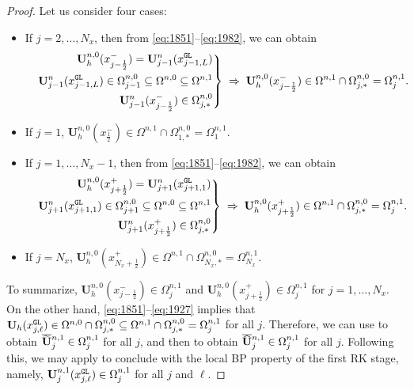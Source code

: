 \documentclass[times,final]{elsarticle}
\numberwithin{equation}{section}
\theoremstyle{definition}
\theoremstyle{remark}
\newcommand{\BU}{\mathbf{U}}
\newcommand{\toBU}{
	\mathrlap{
		\raisebox{1.2 pt}{$\overline{\phantom{\mathbf{U}}}$}
	}
	\mathrlap{
		\raisebox{-0.9 pt}{$\widetilde{\phantom{\mathbf{U}}}$}
	}
	\mathbf{U}
}
\newcommand{\hoBU}{
	\mathrlap{
		\raisebox{1.2 pt}{$\overline{\phantom{\mathbf{U}}}$}
	}
	\mathrlap{
		\raisebox{-0.9 pt}{$\widehat{\phantom{\mathbf{U}}}$}
	}
	\mathbf{U}
}
\begin{document}
\begin{proof}
	Let us consider four cases:
	\begin{itemize}[leftmargin= 6mm]
		\item[(i)] If $j = 2,\dots,N_x$, then from \eqref{eq:1851}--\eqref{eq:1982}, we can obtain
		\begin{equation*}
			\left.
			\begin{aligned}
				&& \BU_h^{n,0}(x_{j-\frac12}^{-}) = \BU^{n}_{j-1}(x^{\tt GL}_{j-1,L})\\
				&& \BU^{n}_{j-1}(x^{\tt GL}_{j-1,L}) \in \Omega^{n, 0}_{j-1} \subseteq \Omega^{n,0} \subseteq \Omega^{n,1} \\
				&& \BU^{n}_{j-1}(x^{-}_{j-\frac12}) \in \Omega^{n, 0}_{j, *}
			\end{aligned}
			\right\}
			\; \Rightarrow \;
			\BU_h^{n,0}(x_{j-\frac12}^{-}) \in \Omega^{n,1} \cap \Omega^{n, 0}_{j, *} = \Omega^{n, 1}_{j}.
		\end{equation*}
		\item[(ii)] If $j = 1$, $\BU^{n,0}_h(x_{\frac12}^{-}) \in \Omega^{n,1} \cap \Omega^{n,0}_{1,*} = \Omega^{n,1}_{1}$. 
		\item[(iii)] If $j = 1,\dots,N_x-1$, then from \eqref{eq:1851}--\eqref{eq:1982}, we can obtain
		\begin{equation*}
			\left.
			\begin{aligned}
				&& \BU_h^{n,0}(x_{j+\frac12}^{+}) = \BU^{n}_{j+1}(x^{\tt GL}_{j+1,1}) \\
				&& \BU^{n}_{j+1}(x^{\tt GL}_{j+1,1}) \in \Omega^{n, 0}_{j+1} \subseteq \Omega^{n,0} \subseteq \Omega^{n,1} \\
				&& \BU^{n}_{j+1}(x^{+}_{j+\frac12}) \in \Omega^{n, 0}_{j, *}
			\end{aligned}
			\right\}
			\;\Rightarrow \;
			\BU_h^{n,0}(x_{j+\frac12}^{+}) \in \Omega^{n,1} \cap \Omega^{n, 0}_{j, *} = \Omega^{n, 1}_{j}.
		\end{equation*}
		\item[(iv)] If $j = N_x$, $\BU^{n,0}_h(x_{N_x +\frac12}^{+}) \in \Omega^{n,1} \cap \Omega^{n,0}_{N_x,*} = \Omega^{n,1}_{N_x}$.
	\end{itemize}
	To summarize, $\BU_h^{n,0}(x_{j-\frac12}^{-}) \in \Omega^{n,1}_j$ and $\BU_h^{n,0}(x_{j+\frac12}^{+}) \in \Omega^{n,1}_j$ for $j = 1,\dots,N_x$.
	On the other hand, \eqref{eq:1851}--\eqref{eq:1927} implies that 
	$\BU_h(x^{\tt GL}_{j,\ell}) \in \Omega^{n,0} \cap \Omega^{n,0}_{j,*} \subseteq \Omega^{n,1} \cap \Omega^{n,0}_{j,*} = \Omega^{n,1}_j$ for all $j$.
	Therefore, we can use  to obtain $\toBU^{n,1}_j \in \Omega^{n,1}_j$ for all $j$, and then  to obtain $\hoBU^{n,1}_j \in \Omega^{n,1}_j$ for all $j$.
	Following this, we may apply  to conclude with the local BP property of the first RK stage, namely, $\BU^{n,1}_j(x^{\tt GL}_{j,\ell}) \in \Omega^{n,1}_j$ for all $j$ and $\ell$.
	

\end{proof}
\end{document}
